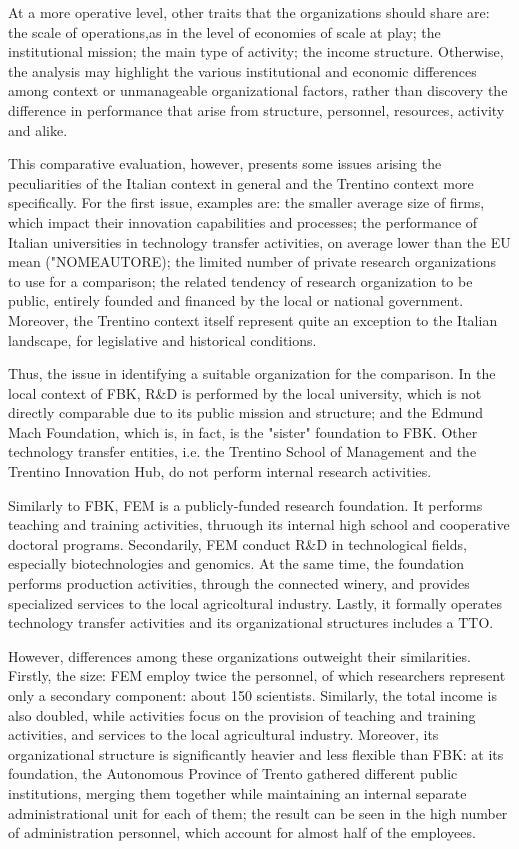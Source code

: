 At a more operative level, other traits that the organizations should share are: the scale of operations,as in the level of economies of scale at play; the institutional mission; the main type of activity; the income structure. Otherwise, the analysis may highlight the various institutional and economic differences among context or unmanageable organizational factors, rather than discovery the difference in performance that arise from structure, personnel, resources, activity and alike.

This comparative evaluation, however, presents some issues arising the peculiarities of the Italian context in general and the Trentino context more specifically. For the first issue, examples are: the smaller average size of firms, which impact their innovation capabilities and processes; the performance of Italian universities in technology transfer activities, on average lower than the EU mean ("NOMEAUTORE); the limited number of private research organizations to use for a comparison; the related tendency of research organization to be public, entirely founded and financed by the local or national government. Moreover, the Trentino context itself  represent quite an exception to the Italian landscape, for legislative and historical conditions. 

Thus, the issue in identifying a suitable organization for the comparison. In the local context of FBK, R\&D is performed by the local university, which is not directly comparable due to its public mission and structure; and the Edmund Mach Foundation, which is, in fact, is the "sister" foundation to FBK. Other technology transfer entities, i.e. the Trentino School of Management and the Trentino Innovation Hub, do not perform internal research activities.

Similarly to FBK, FEM is a publicly-funded research foundation. It performs teaching and training activities, thruough its internal high school and cooperative doctoral programs. Secondarily, FEM conduct R\&D in technological fields, especially  biotechnologies and genomics. At the same time, the foundation performs production activities, through the connected winery, and provides specialized services to the local agricoltural industry. Lastly, it formally operates technology transfer activities and its organizational structures includes a TTO.

However, differences among these organizations outweight their similarities. Firstly, the size: FEM employ twice the  personnel, of which researchers represent only a secondary component: about 150 scientists. Similarly, the total income is also doubled, while activities focus on the provision of teaching and training activities, and services to the local agricultural industry. Moreover, its organizational structure is significantly heavier and less flexible than FBK: at its foundation, the Autonomous Province of Trento gathered different public institutions, merging them together while maintaining an internal separate administrational unit for each of them; the result can be seen in the high number of administration personnel, which account for almost half of the employees. 


